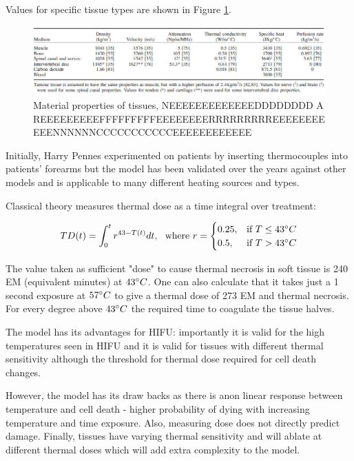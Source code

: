 \documentclass[11pt]{article} %
\begin{document}
	Values for specific tissue types are shown in Figure \ref{fig:tissueproperties}. 
	
	\begin{figure}
		\centering
		\includegraphics[width=1\linewidth]{Report_images/tissueproperties}
		\caption{Material properties of tissues, NEEEEEEEEEEEEEDDDDDDDD A REEEEEEEEEFFFFFFFFFEEEEEEEERRRRRRRRREEEEEEEEEEENNNNNNCCCCCCCCCCCEEEEEEEEEEEE}
		\label{fig:tissueproperties}
	\end{figure}
	
	Initially, Harry Pennes experimented on patients by inserting thermocouples into patients' forearms but the model has been validated over the years against other models and is applicable to many different heating sources and types.
	
	
	
	
	Classical theory \cite{Sapareto1984}  measures thermal dose as a time integral over treatment:
	
\begin{equation}
TD(t)=\int_{0}^{t}r^{43-T(t)}dt,\ \ \text{where  } r=
\begin{cases}
0.25, & \text{if}\ T\leq 43 \degree C \\
0.5, & \text{if}\ T>43 \degree C
\end{cases}
\end{equation}
	
	The value taken as sufficient "dose" to cause thermal necrosis in soft tissue is 240 EM (equivalent minutes) at $43 \degree C $. One can also calculate that it takes just a 1 second exposure at $57 \degree C $ to give a thermal dose of 273 EM and thermal necrosis. For every degree above  $43 \degree C $ the required time to coagulate the tissue halves. 
	
	The model has its advantages for HIFU: importantly it is valid for the high temperatures seen in HIFU and it is valid for tissues with different thermal sensitivity although the threshold for thermal dose required for cell death changes. 
	
	However, the model has its draw backs as there is anon linear response between temperature and cell death - higher probability of dying with increasing temperature and time exposure. Also, measuring dose does not directly predict damage. Finally, tissues have varying thermal sensitivity and will ablate at different thermal doses which will add extra complexity to the model.
	
\end{document}
